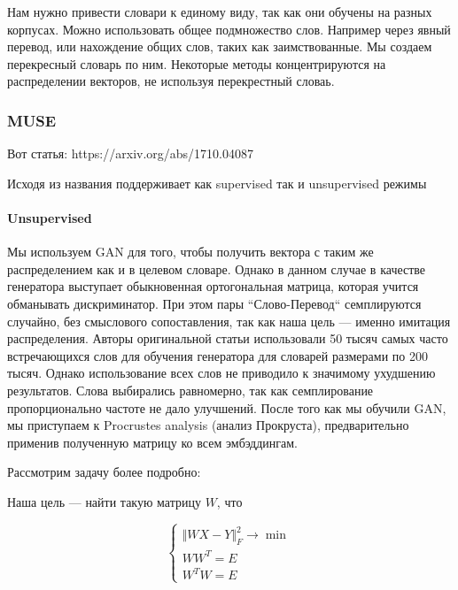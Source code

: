 \documentclass{article}
\begin{document}
    Нам нужно привести словари к единому виду, так как они обучены на разных корпусах. Можно использовать общее подмножество слов.
    Например через явный перевод, или нахождение общих слов, таких как заимствованные. Мы создаем перекресный словарь по ним.
    Некоторые методы концентрируются на распределении векторов, не используя перекрестный словаь.
    
    \subsubsection{MUSE}

    Вот статья: https://arxiv.org/abs/1710.04087

    Исходя из названия поддерживает как supervised так и unsupervised режимы 

    \paragraph{Unsupervised}

    \quad

    Мы используем GAN для того, чтобы получить вектора с таким же распределением как и в целевом словаре.
    Однако в данном случае в качестве генератора выступает обыкновенная ортогональная матрица, 
    которая учится обманывать дискриминатор.
    При этом пары ``Слово-Перевод`` семплируются случайно, без смыслового сопоставления, так  
    как наша цель --- именно имитация распределения. Авторы оригинальной статьи использовали 50 тысяч
    самых часто встречающихся слов для обучения генератора для словарей размерами по 200 тысяч.
    Однако использование всех слов не приводило к значимому ухудшению результатов. 
    Слова выбирались равномерно, так как семплирование пропорционально частоте не дало улучшений.
    После того как мы обучили GAN, мы приступаем к Procrustes analysis (анализ Прокруста), предварительно 
    применив полученную матрицу ко всем эмбэддингам.

    \quad

    Рассмотрим задачу более подробно: 
    
    Наша цель --- найти такую матрицу $W$, что 

    \[
    \begin{cases}
        \Vert WX - Y \Vert_{F}^{2} \rightarrow \min \\
        W W^{T} = E \\
        W^{T} W = E
    \end{cases}
    \]
\end{document}
